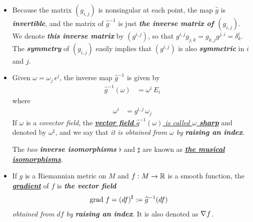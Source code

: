 \documentclass[11pt]{article}
\begin{document}
\begin{itemize}
\item \begin{remark}
Because the matrix $(g_{i,j})$ is nonsingular at each point, the map $\widehat{g}$ is \textit{\textbf{invertible}}, and the matrix of $\widehat{g}^{-1}$ is just \emph{\textbf{the inverse matrix of $(g_{i,j})$}}. We denote \emph{\textbf{this inverse matrix}} by $(g^{i,j})$, so that $g^{i,j} g_{j,k} = g_{k,j} g^{j,i} = \delta_{k}^{i}$. The \emph{\textbf{symmetry}} of $(g_{i,j})$ easily implies that $(g^{i,j})$ is also \emph{\textbf{symmetric}} in $i$ and $j$. 
\end{remark}

\item \begin{definition}
Given $\omega = \omega_j\,\epsilon^{j}$, the inverse map $\widehat{g}^{-1}$ is given by
\begin{align*}
\widehat{g}^{-1}(\omega) &= \omega^i\,E_i
\end{align*}
where
\begin{align}
\omega^{i} &= g^{i,j}\,\omega_{j} \label{eqn: rieman_raising_index}
\end{align} If $\omega$ is a \emph{covector field}, the \underline{\emph{\textbf{vector field} $\widehat{g}^{-1}(\omega)$ is called \textbf{$\omega$ sharp}}} and denoted by \underline{$\omega^{\sharp}$}, and we say that \emph{it is obtained from $\omega$ by} \emph{\textbf{raising an index}}.
\end{definition}

\begin{definition}
The \emph{two \textbf{inverse isomorphisms}} $\flat$ and $\sharp$ are known as \underline{\emph{\textbf{the musical isomorphisms}}}.
\end{definition}

\item \begin{definition}
If $g$ is a Riemannian metric on $M$ and $f: M \rightarrow {\mathbb R}$ is a smooth function, the \underline{\emph{\textbf{gradient}}} of $f$ is \emph{\textbf{the vector field}}
\begin{align*}
\text{grad }f &= \left(df\right)^{\sharp} := \widehat{g}^{-1}(df)
\end{align*}  \emph{obtained from $df$ by \textbf{raising an index}}. It is also denoted as $\nabla_{}{f}$.
\end{definition}


\end{itemize}
\end{document}
